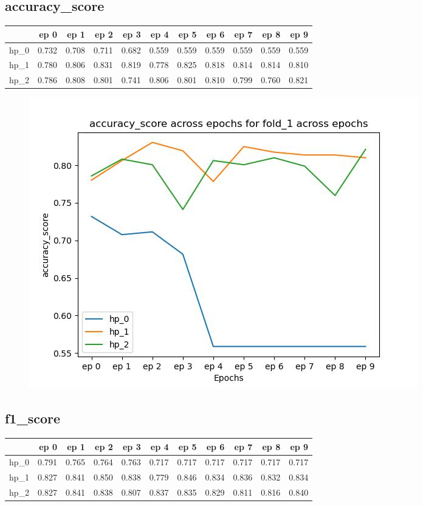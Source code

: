 \documentclass{article}
\begin{document}
\subsection{accuracy\_score}
\begin{tabular}{lrrrrrrrrrr}
\toprule
{} &   ep 0 &   ep 1 &   ep 2 &   ep 3 &   ep 4 &   ep 5 &   ep 6 &   ep 7 &   ep 8 &   ep 9 \\
\midrule
hp\_0 &  0.732 &  0.708 &  0.711 &  0.682 &  0.559 &  0.559 &  0.559 &  0.559 &  0.559 &  0.559 \\
hp\_1 &  0.780 &  0.806 &  0.831 &  0.819 &  0.778 &  0.825 &  0.818 &  0.814 &  0.814 &  0.810 \\
hp\_2 &  0.786 &  0.808 &  0.801 &  0.741 &  0.806 &  0.801 &  0.810 &  0.799 &  0.760 &  0.821 \\
\bottomrule
\end{tabular}

\begin{figure}[H]
\includegraphics[scale = 0.75]{fold_1/accuracy_score}
\end{figure}
\subsection{f1\_score}
\begin{tabular}{lrrrrrrrrrr}
\toprule
{} &   ep 0 &   ep 1 &   ep 2 &   ep 3 &   ep 4 &   ep 5 &   ep 6 &   ep 7 &   ep 8 &   ep 9 \\
\midrule
hp\_0 &  0.791 &  0.765 &  0.764 &  0.763 &  0.717 &  0.717 &  0.717 &  0.717 &  0.717 &  0.717 \\
hp\_1 &  0.827 &  0.841 &  0.850 &  0.838 &  0.779 &  0.846 &  0.834 &  0.836 &  0.832 &  0.834 \\
hp\_2 &  0.827 &  0.841 &  0.838 &  0.807 &  0.837 &  0.835 &  0.829 &  0.811 &  0.816 &  0.840 \\
\bottomrule
\end{tabular}
\end{document}
